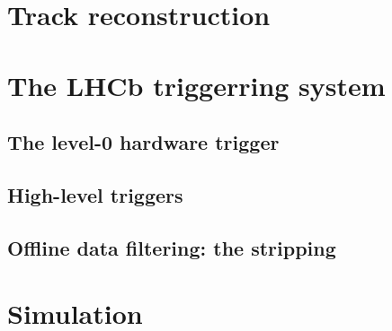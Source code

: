 


\section{Track reconstruction} %
\label{sec:reconstruction}


\section{The LHCb triggerring system} %
\label{sec:the_lhcb_triggerring_system}


\subsection{The level-0 hardware trigger} %
\label{sub:the_level_0_hardware_trigger}


\subsection{High-level triggers} %
\label{sub:high_level_triggers}


\subsection{Offline data filtering: the \lhcb stripping} %
\label{sub:offline_data_filtering_the_lhcb_stripping}





\section{Simulation} %
\label{sec:simulation}

